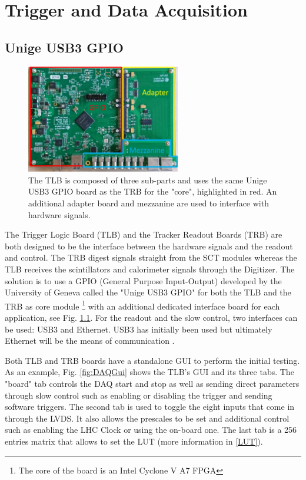 \chapter{Trigger and Data Acquisition}
\section{Unige USB3 GPIO}

\begin{figure}[htbp!]
    \centering    
    \includegraphics[width=0.6\textwidth]{ChapterDAQ/Figs/GeneralDAQ/UnigeUSB3GPIO.jpg}
    \caption[Unige USB3 GPIO]{The TLB is composed of three sub-parts and uses the same Unige USB3 GPIO board as the TRB for the "core", highlighted in red. An additional adapter board and mezzanine are used to interface with hardware signals.}
    \label{fig:UnigeUSB3GPIO}
\end{figure}

The Trigger Logic Board (TLB) and the Tracker Readout Boards (TRB) are both designed to be the interface between the hardware signals and the readout and control. The TRB digest signals straight from the SCT modules whereas the TLB receives the scintillators and calorimeter signals through the Digitizer. The solution is to use a GPIO (General Purpose Input-Output) developed by the University of Geneva called the "Unige USB3 GPIO" for both the TLB and the TRB as core module \footnote{The core of the board is an Intel Cyclone V A7 FPGA} with an additional dedicated interface board for each application, see Fig. \ref{fig:UnigeUSB3GPIO}. For the readout and the slow control, two interfaces can be used: USB3 and Ethernet. USB3 has initially been used but ultimately Ethernet will be the means of communication \cite{faser_collaboration_technical_2018}.


Both TLB and TRB boards have a standalone GUI to perform the initial testing. As an example, Fig. \ref{fig:DAQGui} shows the TLB's GUI and its three tabs. The "board" tab controls the DAQ start and stop as well as sending direct parameters through slow control such as enabling or disabling the trigger and sending software triggers. The second tab is used to toggle the eight inputs that come in through the LVDS. It also allows the prescales to be set and additional control such as enabling the LHC Clock or using the on-board one.  The last tab is a 256 entries matrix that allows to set the LUT (more information in \ref{LUT}).

